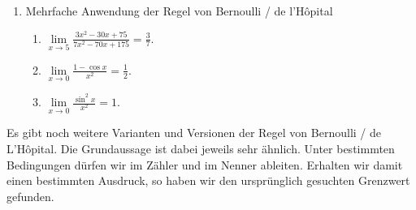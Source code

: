 \begin{enumerate}
    
    
    \item Mehrfache Anwendung der Regel von Bernoulli / de l'Hôpital
    \begin{enumerate}
        \item $\lim\limits_{x \to 5} \frac{3x^2 - 30x + 75}{7x^2 - 70x + 175} = \frac{3}{7}$.
        \item $\lim\limits_{x \to 0} \frac{1 - \cos x}{x^2} = \frac{1}{2}$.
        \item $\lim\limits_{x \to 0} \frac{\sin^2 x}{x^2} = 1$.
    \end{enumerate}
\end{enumerate}

  











\clearpage
 Es gibt noch weitere Varianten und Versionen der Regel von Bernoulli / de L'Hôpital. Die Grundaussage ist dabei jeweils sehr ähnlich. Unter bestimmten Bedingungen dürfen wir im Zähler und im Nenner ableiten. Erhalten wir damit einen bestimmten Ausdruck, so haben wir den ursprünglich gesuchten Grenzwert gefunden.
 
